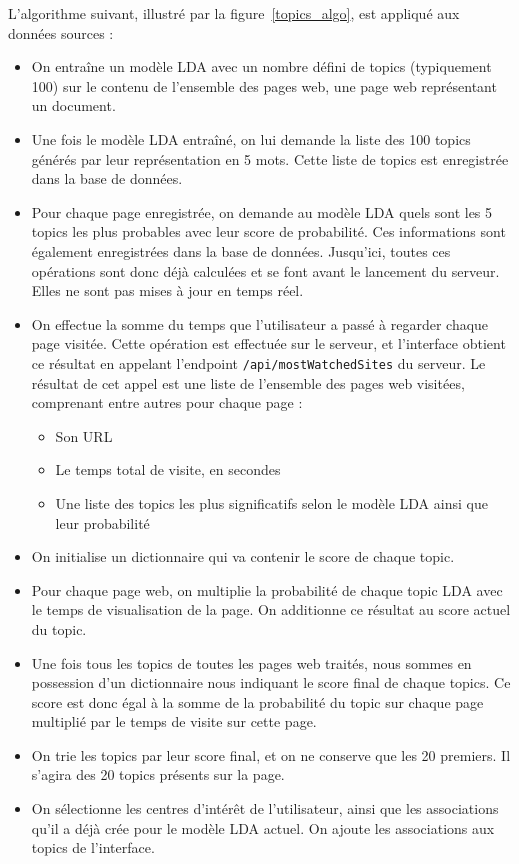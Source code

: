 			L'algorithme suivant, illustré par la figure~\ref{topics_algo}, est appliqué aux données sources :
			\begin{itemize}
				\item On entraîne un modèle LDA avec un nombre défini de topics (typiquement 100) sur le contenu de l'ensemble des pages web,  une page web représentant un document.
				\item Une fois le modèle LDA entraîné, on lui demande la liste des 100 topics générés par leur représentation en 5 mots. Cette liste de topics est enregistrée dans la base de données.
				\item Pour chaque page enregistrée, on demande au modèle LDA quels sont les 5 topics les plus probables avec leur score de probabilité. Ces informations sont également enregistrées dans la base de données. Jusqu'ici, toutes ces opérations sont donc déjà calculées et se font avant le lancement du serveur. Elles ne sont pas mises à jour en temps réel.
				\item On effectue la somme du temps que l'utilisateur a passé à regarder chaque page visitée. Cette opération est effectuée sur le serveur, et l'interface obtient ce résultat en appelant l'endpoint \texttt{/api/mostWatchedSites} du serveur. Le résultat de cet appel est une liste de l'ensemble des pages web visitées, comprenant entre autres pour chaque page : 
				\begin{itemize}
					\item Son URL
					\item Le temps total de visite, en secondes
					\item Une liste des topics les plus significatifs selon le modèle LDA ainsi que leur probabilité
				\end{itemize}
				\item On initialise un dictionnaire qui va contenir le score de chaque topic.
				\item Pour chaque page web, on multiplie la probabilité de chaque topic LDA avec le temps de visualisation de la page. On additionne ce résultat au score actuel du topic.
				\item Une fois tous les topics de toutes les pages web traités, nous sommes en possession d'un dictionnaire nous indiquant le score final de chaque topics. Ce score est donc égal à la somme de la probabilité du topic sur chaque page multiplié par le temps de visite sur cette page.
				\item On trie les topics par leur score final, et on ne conserve que les 20 premiers. Il s'agira des 20 topics présents sur la page.
				\item On sélectionne les centres d'intérêt de l'utilisateur, ainsi que les associations qu'il a déjà crée pour le modèle LDA actuel. On ajoute les associations aux topics de l'interface.
			\end{itemize}

